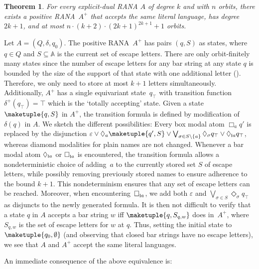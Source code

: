 \documentclass[10pt,a4paper]{amsart}
\newtheorem{theo}{Theorem}[section]
\theoremstyle{definition}
\newcommand{\seq}{\subseteq}
\newcommand{\At}{\mathds{A}}
\newcommand{\pos}[1]{{#1}^{+}}
\newcommand{\set}[1]{\{#1\}}
\newcommand{\scriptmidmid}{\hspace{0.2ex}{\rule[-0.1ex]{0.6pt}{1.1ex}}\hspace{0.2ex}}
\newcommand{\scriptnew}[1]{{\scriptmidmid}#1}
\renewcommand{\enquote}[1]{`#1'}
\begin{document}
\begin{theo}\label{lem:constr02}
For every explicit-dual RANA $A$ of degree $k$ and with $n$ orbits, there exists a positive RANA~$\pos{A}$ that accepts the same literal language, has degree $2k + 1$, and at most $n \cdot (k + 2) \cdot (2k + 1)^{2k + 1} +1$ orbits. 
\end{theo}
\begin{IEEEproof}
  Let $A=(Q,\delta,q_0)$. The positive RANA~$\pos{A}$ has pairs $(q,S)$ as states, where $q\in Q$ and $S\seq \At$ is the current set of escape letters. There are only orbit-finitely many states since the number of escape letters for any
  bar string at any state $q$ is bounded by the size of the support of that state with one additional
  letter (). Therefore, we only need to store at most $k + 1$ letters
  simultaneously. Additionally, $\pos{A}$ has a single equivariant state~$q_{\top}$
  with transition function $\pos\delta(q_{\top}) = \top$ which is the \enquote{totally
  accepting} state. Given a state $\maketuple{q, S}$ in $\pos{A}$,
  the transition formula is defined by modification of $\delta(q)$ in $A$. We sketch the
  different possibilities: Every box modal atom $\Box_a q'$ is replaced by the disjunction
  $\varepsilon \vee \Diamond_a \maketuple{q',S} \vee \bigvee_{\sigma \in S \setminus \set{a}}
  \Diamond_\sigma q_{\top} \vee \Diamond_{\scriptnew{a}} q_{\top}$, whereas diamond modalities
  for plain names are not changed. Whenever a bar modal atom $\Diamond_{\scriptnew{a}}$ or
  $\Box_{\scriptnew{a}}$ is encountered, the transition formula allows a nondeterministic
  choice of adding~$a$ to the currently stored set $S$ of escape letters, while possibly
  removing previously stored names to ensure adherence to the bound $k + 1$. 
  This nondeterminism ensures that any set of escape letters can be reached. Moreover, when encountering~$\Box_{\scriptnew{a}}$, we add both $\varepsilon$
  and $\bigvee_{\sigma \in S} \Diamond_\sigma q_{\top}$ as disjuncts to the newly generated
  formula. It is
then not difficult to verify that a state $q$ in $A$ accepts a bar string $w$ iff $\maketuple{q, S_{q,w}}$
  does in~$\pos{A}$, where $S_{q,w}$ is the set of escape letters for $w$ at $q$. Thus, setting the initial state to $\maketuple{q_0, \emptyset}$ (and observing that closed bar strings have no escape letters), we see that $A$ and $A^+$ accept the same literal languages.
\end{IEEEproof}

An immediate consequence of the above equivalence is:
\end{document}
